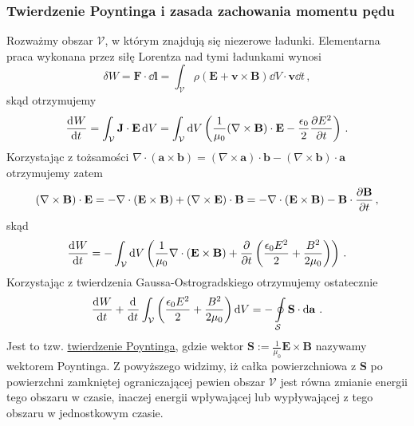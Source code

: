 \documentclass[../main.tex]{subfiles}
\begin{document}
\subsubsection{Twierdzenie Poyntinga i zasada zachowania momentu pędu}
Rozważmy obszar \(\mathcal{V}\), w którym znajdują się niezerowe ładunki. Elementarna praca wykonana przez siłę Lorentza nad tymi ładunkami wynosi
\begin{equation*}
    \delta W=\mathbf{F}\cdot\dd{\mathbf{l}}=\int_\mathcal{V}\rho(\mathbf{E}+\mathbf{v}\times\mathbf{B})\dd{V}\cdot\mathbf{v}\dd{t}\,,
\end{equation*}
skąd otrzymujemy
\begin{equation*}
    \dv[]{W}{t}=\int_\mathcal{V}\mathbf{J}\cdot\mathbf{E}\dd{V}=\int_\mathcal{V}\dd{V}\left(\frac{1}{\mu_0}(\nabla\times\mathbf{B})\cdot\mathbf{E}-\frac{\epsilon_0}{2}\pdv{E^2}{t}\right)\,.
\end{equation*}
Korzystając z tożsamości \(\nabla\cdot(\mathbf{a}\times\mathbf{b})=(\nabla\times\mathbf{a})\cdot\mathbf{b}-(\nabla\times\mathbf{b})\cdot\mathbf{a}\) otrzymujemy zatem
\begin{equation*}
    (\nabla\times\mathbf{B})\cdot\mathbf{E}=-\nabla\cdot(\mathbf{E}\times\mathbf{B})+(\nabla\times\mathbf{E})\cdot\mathbf{B}=-\nabla\cdot(\mathbf{E}\times\mathbf{B})-\mathbf{B}\cdot\pdv{\mathbf{B}}{t}\,,
\end{equation*}
skąd
\begin{equation*}
    \dv[]{W}{t}=-\int_\mathcal{V}\dd{V}\left(\frac{1}{\mu_0}\nabla\cdot(\mathbf{E}\times\mathbf{B})+\pdv{}{t}\left(\frac{\epsilon_0E^2}{2}+\frac{B^2}{2\mu_0}\right)\right)\,.
\end{equation*}
Korzystając z twierdzenia Gaussa-Ostrogradskiego otrzymujemy ostatecznie
\begin{equation*}
    \dv[]{W}{t}+\dv[]{}{t}\int_\mathcal{V}\left(\frac{\epsilon_0E^2}{2}+\frac{B^2}{2\mu_0}\right)\dd{V}=-\oint\limits_\mathcal{S}\mathbf{S}\cdot\dd{\mathbf{a}}\,.
\end{equation*}
Jest to tzw. \underline{twierdzenie Poyntinga}, gdzie wektor \(\mathbf{S}:=\frac{1}{\mu_0}\mathbf{E}\times\mathbf{B}\) nazywamy wektorem Poyntinga. Z powyższego widzimy, iż całka powierzchniowa z \(\mathbf{S}\) po powierzchni zamkniętej ograniczającej pewien obszar \(\mathcal{V}\) jest równa zmianie energii tego obszaru w czasie, inaczej energii wpływającej lub wypływającej z tego obszaru w jednostkowym czasie.
\end{document}
